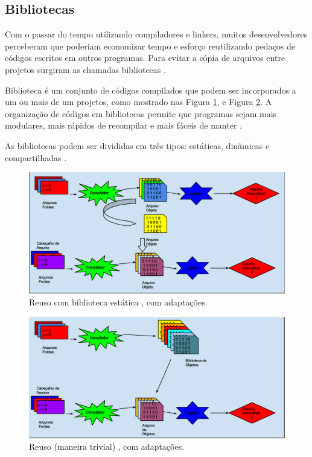 \subsection{Bibliotecas}

Com o passar do tempo utilizando compiladores e linkers, muitos 
desenvolvedores perceberam que poderiam economizar tempo e esforço 
reutilizando pedaços de códigos escritos em outros programas. Para evitar a
 cópia de arquivos entre projetos surgiram as chamadas bibliotecas \cite[pág.  227]{ref36}.

Biblioteca é um conjunto de códigos compilados que podem ser incorporados a
 um ou mais de um projetos, como mostrado nas Figura \ref{fig04}, e Figura
 \ref{fig05}. A organização de códigos em bibliotecas permite que 
programas sejam mais modulares, mais rápidos de recompilar e mais 
fáceis de manter \cite{Lasca}.

As bibliotecas podem ser divididas em três tipos: estáticas, 
dinâmicas e compartilhadas \cite{Lasca}.

\begin{figure}[h]
    \centering
        \includegraphics[keepaspectratio=true,scale=0.38]{figuras/reuso_lib_estatica.eps}
    \caption{Reuso com biblioteca estática \cite[pág.  54]{ref39}, com adaptações.}
    \label{fig04}
\end{figure}

\begin{figure}[h]
    \centering
        \includegraphics[keepaspectratio=true,scale=0.38]{figuras/reuso_lib_estatica2.eps}
    \caption{Reuso (maneira trivial) \cite[pág.  54]{ref39}, com adaptações.}
    \label{fig05}
\end{figure}


